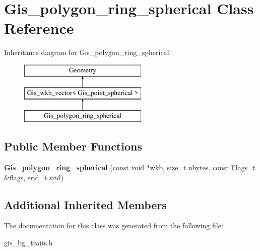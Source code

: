 \hypertarget{classGis__polygon__ring__spherical}{}\section{Gis\+\_\+polygon\+\_\+ring\+\_\+spherical Class Reference}
\label{classGis__polygon__ring__spherical}
Inheritance diagram for Gis\+\_\+polygon\+\_\+ring\+\_\+spherical\+:\begin{figure}[H]
\begin{center}
\leavevmode
\includegraphics[height=3.000000cm]{classGis__polygon__ring__spherical}
\end{center}
\end{figure}
\subsection*{Public Member Functions}
\begin{DoxyCompactItemize}
\item 
\mbox{\label{classGis__polygon__ring__spherical_ae260a32829ced289d3e09dc78f5711b6}} 
{\bfseries Gis\+\_\+polygon\+\_\+ring\+\_\+spherical} (const void $\ast$wkb, size\+\_\+t nbytes, const \mbox{\hyperlink{classGeometry_1_1Flags__t}{Flags\+\_\+t}} \&flags, srid\+\_\+t srid)
\end{DoxyCompactItemize}
\subsection*{Additional Inherited Members}


The documentation for this class was generated from the following file\+:\begin{DoxyCompactItemize}
\item 
gis\+\_\+bg\+\_\+traits.\+h\end{DoxyCompactItemize}
